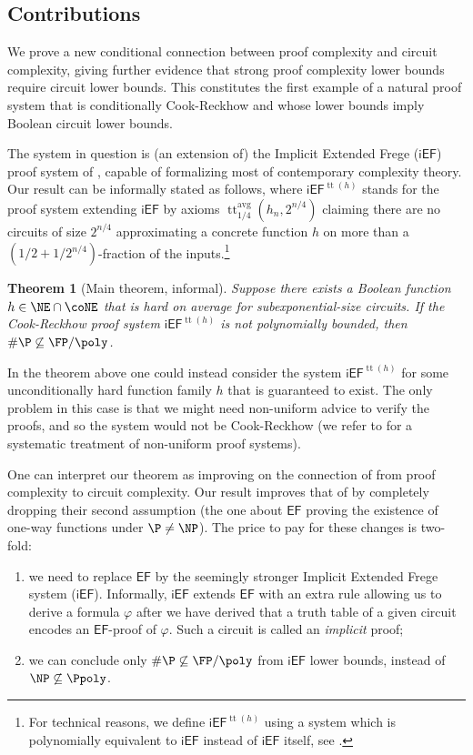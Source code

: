 \documentclass[11pt]{article}
\newcommand{\EF}{\mathsf{EF}}
\newcommand{\iEF}{\mathsf{iEF}}
\theoremstyle{definition}
\theoremstyle{plain}
\newtheorem{theorem}[definition]{Theorem}
\theoremstyle{remark}
\DeclareMathOperator*{\ttt}{tt}
\newcommand{\ttable}{\ttt^{\operatorname{avg}}}
\begin{document}
\subsection*{Contributions}
We prove a new conditional connection between proof complexity and circuit complexity, giving further evidence that strong proof complexity lower bounds require circuit lower bounds. This constitutes the first example of a natural proof system that is conditionally Cook-Reckhow and whose lower bounds imply Boolean circuit lower bounds.

The system in question is (an extension of) the Implicit Extended Frege ($\iEF$) proof system of \citeauthor{Kra04} \cite{Kra04}, capable of formalizing most of contemporary complexity theory. Our result can be informally stated as follows, where 
$\iEF^{\operatorname{tt}(h)}$ stands for the proof system extending $\iEF$ by axioms $\ttable_{1/4}(h_n,2^{n/4})$ claiming there are no circuits of size $2^{n/4}$ approximating a concrete function $h$ on more than a $(1/2 + 1/{2^{n/4}})$-fraction of the inputs.\footnote{For technical reasons, we define $\iEF^{\operatorname{tt}(h)}$ using a system which is polynomially equivalent to $\iEF$ instead of $\iEF$ itself, see .}

\begin{theorem}
[Main theorem, informal]  \label{thm:main}
  Suppose there exists a Boolean function $h \in \NE \cap \coNE$ that is hard on average for subexponential-size circuits. If the Cook-Reckhow proof system $\iEF^{\operatorname{tt}(h)}$ is not polynomially bounded, then $\#\P \not\subseteq \FP/\poly$.
\end{theorem}

In the theorem above one could instead consider the system $\iEF^{\operatorname{tt}(h)}$ for some unconditionally hard function family $h$ that is guaranteed to exist. The only problem in this case is that we might need non-uniform advice to verify the proofs, and so the system would not be Cook-Reckhow (we refer to \citeauthor{CK07} \cite{CK07} for a systematic treatment of non-uniform proof systems).

One can interpret our theorem as improving on the connection of \citeauthor{Pseopt} \cite{Pseopt} from proof complexity to circuit complexity. Our result improves that of \citeauthor{Pseopt} by completely dropping their second assumption (the one about $\EF$ proving the existence of one-way functions under $\P \neq \NP$). The price to pay for these changes is two-fold: 
\begin{enumerate}
\item we need to replace $\EF$ by the seemingly stronger Implicit Extended Frege system ($\iEF$). Informally, $\iEF$ extends $\EF$ with an extra rule allowing us to derive a formula $\varphi$ after we have derived that a truth table of a given circuit encodes an $\EF$-proof of $\varphi$. Such a circuit is called an \emph{implicit} proof;

\item we can conclude only $\#\P\not\subseteq \FP/\poly$ from $\iEF$ lower bounds, instead of $\NP \not\subseteq \Ppoly$.
\end{enumerate}
\end{document}
